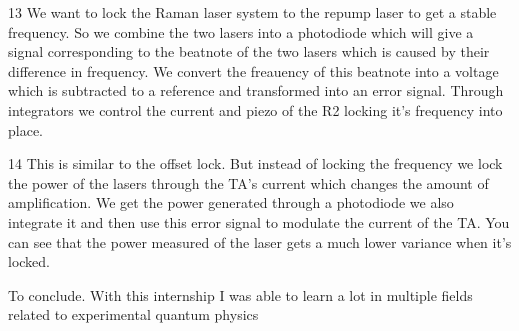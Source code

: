 13 We want to lock the Raman laser system to the repump laser to get a stable frequency. So we combine the two lasers into a photodiode which will give a signal corresponding to the beatnote of the two lasers which is caused by their difference in frequency. We convert the freauency of this beatnote into a voltage which is subtracted to a reference and transformed into an error signal. Through integrators we control the current and piezo of the R2 locking it's frequency into place.

14 This is similar to the offset lock. But instead of locking the frequency we lock the power of the lasers through the TA's current which changes the amount of amplification. We get the power generated through a photodiode we also integrate it and then use this error signal to modulate the current of the TA. You can see that the power measured of the laser gets a much lower variance when it's locked.

To conclude. With this internship I was able to learn a lot in multiple fields related to experimental quantum physics